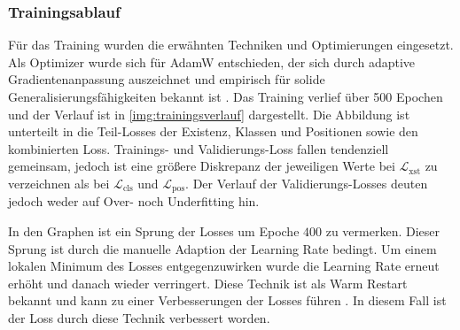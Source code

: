 
\subsubsection{Trainingsablauf}

Für das Training wurden die erwähnten Techniken und Optimierungen eingesetzt. Als Optimizer wurde sich für AdamW entschieden, der sich durch adaptive Gradientenanpassung auszeichnet und empirisch für solide Generalisierungsfähigkeiten bekannt ist \cite{adamw, adamw_good, adamw_good2, adamw_good3, adamw_good4}. Das Training verlief über 500 Epochen und der Verlauf ist in \autoref{img:trainingsverlauf} dargestellt. Die Abbildung ist unterteilt in die Teil-Losses der Existenz, Klassen und Positionen sowie den kombinierten Loss. Trainings- und Validierungs-Loss fallen tendenziell gemeinsam, jedoch ist eine größere Diskrepanz der jeweiligen Werte bei $\mathcal{L}_\text{xst}$ zu verzeichnen als bei $\mathcal{L}_\text{cls}$ und $\mathcal{L}_\text{pos}$. Der Verlauf der Validierungs-Losses deuten jedoch weder auf Over- noch Underfitting hin.

In den Graphen ist ein Sprung der Losses um Epoche $400$ zu vermerken. Dieser Sprung ist durch die manuelle Adaption der Learning Rate bedingt. Um einem lokalen Minimum des Losses entgegenzuwirken wurde die Learning Rate erneut erhöht und danach wieder verringert. Diese Technik ist als Warm Restart bekannt und kann zu einer Verbesserungen der Losses führen \cite{lr_warm_restart}. In diesem Fall ist der Loss durch diese Technik verbessert worden.


